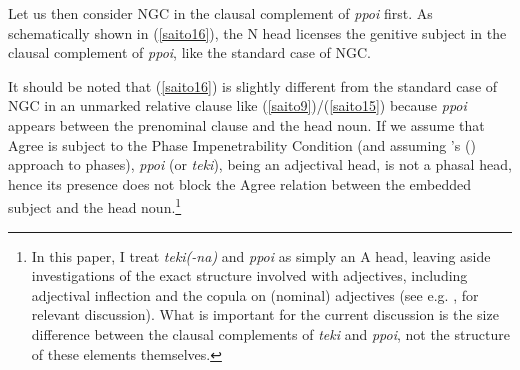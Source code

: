 \documentclass[output=paper]{langscibook}
\begin{document}
\begin{exe}
\ex \label{saito15}
\end{exe}

Let us then consider NGC in the clausal complement of \emph{ppoi} first. As schematically shown in (\ref{saito16}), the N head licenses the genitive subject in the clausal complement of \emph{ppoi}, like the standard case of NGC.

\begin{exe}
\ex \label{saito16}
\end{exe}

It should be noted that (\ref{saito16}) is slightly different from the standard case of NGC in an unmarked relative clause like (\ref{saito9})/(\ref{saito15}) because \emph{ppoi} appears between the prenominal clause and the head noun. If we assume that Agree is subject to the Phase Impenetrability Condition (and assuming \citeauthor{Chomsky2000}'s (\citeyear{Chomsky2000,Chomsky2001}) approach to phases), \emph{ppoi} (or \emph{teki}), being an adjectival head, is not a phasal head, hence its presence does not block the Agree relation between the embedded subject and the head noun.\footnote{In this paper, I treat \emph{teki(-na)} and \emph{ppoi} as simply an A head, leaving aside investigations of the exact structure involved with adjectives, including adjectival inflection and the copula on (nominal) adjectives (see e.g. \citealt{nishiyama1999}, \citealt{Yamakido2005,Yamakido2013} for relevant discussion). What is important for the current discussion is the size difference between the clausal complements of \emph{teki} and \emph{ppoi}, not the structure of these elements themselves.}
\end{document}
